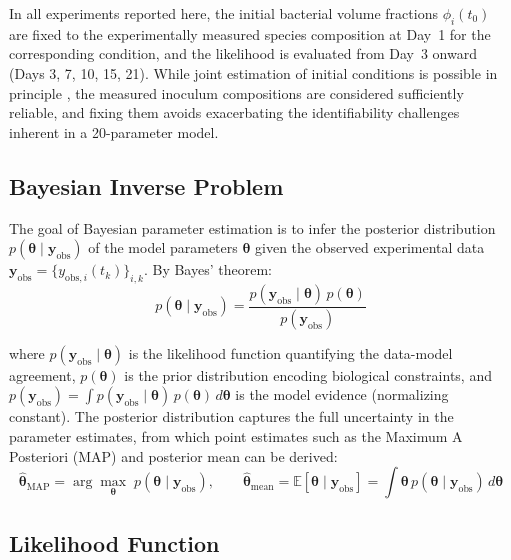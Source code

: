 \documentclass[11pt,a4paper]{article}
\begin{document}
In all experiments reported here, the initial bacterial volume fractions $\phi_i(t_0)$ are fixed to the experimentally measured species composition at Day~1 for the corresponding condition, and the likelihood is evaluated from Day~3 onward (Days 3, 7, 10, 15, 21). While joint estimation of initial conditions is possible in principle \cite{Villaverde2022BayesianSysBio}, the measured inoculum compositions are considered sufficiently reliable, and fixing them avoids exacerbating the identifiability challenges inherent in a 20-parameter model.

\subsection{Bayesian Inverse Problem}

The goal of Bayesian parameter estimation is to infer the posterior distribution $p(\boldsymbol{\theta} \mid \mathbf{y}_{\mathrm{obs}})$ of the model parameters $\boldsymbol{\theta}$ given the observed experimental data $\mathbf{y}_{\mathrm{obs}} = \{y_{\mathrm{obs},i}(t_k)\}_{i,k}$. By Bayes' theorem:
\begin{equation}
p(\boldsymbol{\theta} \mid \mathbf{y}_{\mathrm{obs}}) = \frac{p(\mathbf{y}_{\mathrm{obs}} \mid \boldsymbol{\theta})\, p(\boldsymbol{\theta})}{p(\mathbf{y}_{\mathrm{obs}})}
\label{eq:bayes}
\end{equation}

\noindent where $p(\mathbf{y}_{\mathrm{obs}} \mid \boldsymbol{\theta})$ is the likelihood function quantifying the data-model agreement, $p(\boldsymbol{\theta})$ is the prior distribution encoding biological constraints, and $p(\mathbf{y}_{\mathrm{obs}}) = \int p(\mathbf{y}_{\mathrm{obs}} \mid \boldsymbol{\theta})\, p(\boldsymbol{\theta})\, d\boldsymbol{\theta}$ is the model evidence (normalizing constant). The posterior distribution captures the full uncertainty in the parameter estimates, from which point estimates such as the Maximum A Posteriori (MAP) and posterior mean can be derived:
\begin{equation}
\hat{\boldsymbol{\theta}}_{\mathrm{MAP}} = \arg\max_{\boldsymbol{\theta}} \; p(\boldsymbol{\theta} \mid \mathbf{y}_{\mathrm{obs}}), \qquad
\hat{\boldsymbol{\theta}}_{\mathrm{mean}} = \mathbb{E}[\boldsymbol{\theta} \mid \mathbf{y}_{\mathrm{obs}}] = \int \boldsymbol{\theta}\, p(\boldsymbol{\theta} \mid \mathbf{y}_{\mathrm{obs}})\, d\boldsymbol{\theta}
\end{equation}

\subsection{Likelihood Function}
\end{document}
